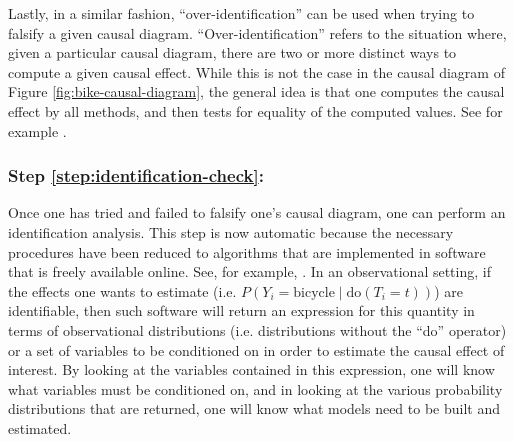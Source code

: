 Lastly, in a similar fashion, ``over-identification'' can be used when trying to falsify a given causal diagram. ``Over-identification'' refers to the situation where, given a particular causal diagram, there are two or more distinct ways to compute a given causal effect. While this is not the case in the causal diagram of Figure \ref{fig:bike-causal-diagram}, the general idea is that one computes the causal effect by all methods, and then tests for equality of the computed values. See for example \citet{sargan1958estimation, kirby2009using}.


\subsubsection*{Step \ref{step:identification-check}:}
Once one has tried and failed to falsify one's causal diagram, one can perform an identification analysis. This step is now automatic because the necessary procedures have been reduced to algorithms that are implemented in software that is freely available online. See, for example, \citet{breitling2010dagr, textor2016robust, tikka_2017_identifying}. In an observational setting, if the effects one wants to estimate (i.e. $P \left( Y_i = \textrm{bicycle} \mid \textrm{do} \left( T_i = t \right) \right)$) are identifiable, then such software will return an expression for this quantity in terms of observational distributions (i.e. distributions without the ``do'' operator) or a set of variables to be conditioned on in order to estimate the causal effect of interest. By looking at the variables contained in this expression, one will know what variables must be conditioned on, and in looking at the various probability distributions that are returned, one will know what models need to be built and estimated.

